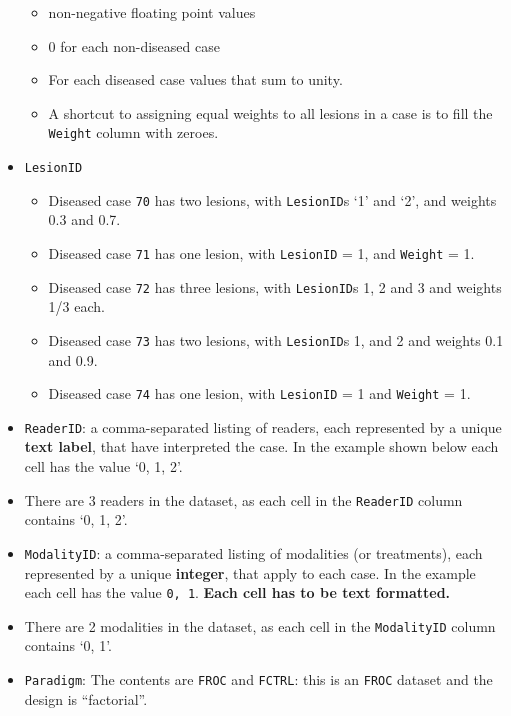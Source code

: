 \documentclass[
]{book}
\providecommand{\tightlist}{%
  \setlength{\itemsep}{0pt}\setlength{\parskip}{0pt}}
\begin{document}
\begin{itemize}
  \begin{itemize}
  \tightlist
  \item
    non-negative floating point values
  \item
    0 for each non-diseased case
  \item
    For each diseased case values that sum to unity.
  \item
    A shortcut to assigning equal weights to all lesions in a case is to fill the \texttt{Weight} column with zeroes.
  \end{itemize}
\item
  \texttt{LesionID}

  \begin{itemize}
  \tightlist
  \item
    Diseased case \texttt{70} has two lesions, with \texttt{LesionID}s `1' and `2', and weights 0.3 and 0.7.
  \item
    Diseased case \texttt{71} has one lesion, with \texttt{LesionID} = 1, and \texttt{Weight} = 1.
  \item
    Diseased case \texttt{72} has three lesions, with \texttt{LesionID}s 1, 2 and 3 and weights 1/3 each.
  \item
    Diseased case \texttt{73} has two lesions, with \texttt{LesionID}s 1, and 2 and weights 0.1 and 0.9.
  \item
    Diseased case \texttt{74} has one lesion, with \texttt{LesionID} = 1 and \texttt{Weight} = 1.
  \end{itemize}
\item
  \texttt{ReaderID}: a comma-separated listing of readers, each represented by a unique \textbf{text label}, that have interpreted the case. In the example shown below each cell has the value `0, 1, 2'.
\item
  There are 3 readers in the dataset, as each cell in the \texttt{ReaderID} column contains `0, 1, 2'.
\item
  \texttt{ModalityID}: a comma-separated listing of modalities (or treatments), each represented by a unique \textbf{integer}, that apply to each case. In the example each cell has the value \texttt{0,\ 1}. \textbf{Each cell has to be text formatted.}
\item
  There are 2 modalities in the dataset, as each cell in the \texttt{ModalityID} column contains `0, 1'.
\item
  \texttt{Paradigm}: The contents are \texttt{FROC} and \texttt{FCTRL}: this is an \texttt{FROC} dataset and the design is ``factorial''.
\end{itemize}
\end{document}

